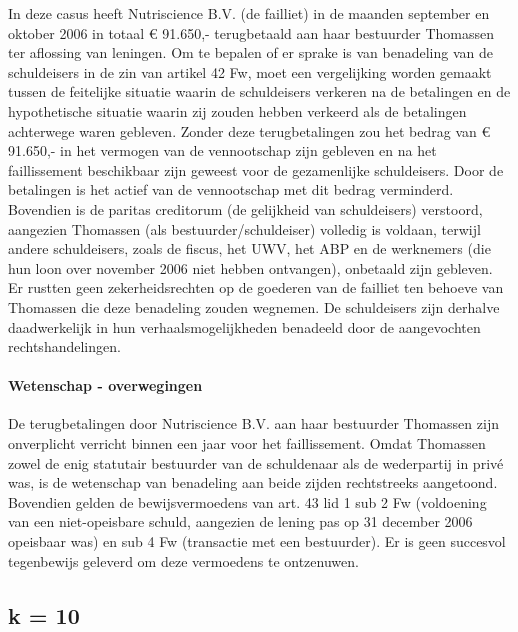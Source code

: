 \documentclass[
  dutch,
  a4paper,
]{article}
\begin{document}
In deze casus heeft Nutriscience B.V. (de failliet) in de maanden september en oktober 2006 in totaal € 91.650,- terugbetaald aan haar bestuurder Thomassen ter aflossing van leningen. Om te bepalen of er sprake is van benadeling van de schuldeisers in de zin van artikel 42 Fw, moet een vergelijking worden gemaakt tussen de feitelijke situatie waarin de schuldeisers verkeren na de betalingen en de hypothetische situatie waarin zij zouden hebben verkeerd als de betalingen achterwege waren gebleven. Zonder deze terugbetalingen zou het bedrag van € 91.650,- in het vermogen van de vennootschap zijn gebleven en na het faillissement beschikbaar zijn geweest voor de gezamenlijke schuldeisers. Door de betalingen is het actief van de vennootschap met dit bedrag verminderd. Bovendien is de paritas creditorum (de gelijkheid van schuldeisers) verstoord, aangezien Thomassen (als bestuurder/schuldeiser) volledig is voldaan, terwijl andere schuldeisers, zoals de fiscus, het UWV, het ABP en de werknemers (die hun loon over november 2006 niet hebben ontvangen), onbetaald zijn gebleven. Er rustten geen zekerheidsrechten op de goederen van de failliet ten behoeve van Thomassen die deze benadeling zouden wegnemen. De schuldeisers zijn derhalve daadwerkelijk in hun verhaalsmogelijkheden benadeeld door de aangevochten rechtshandelingen.

\paragraph{Wetenschap - overwegingen}\label{wetenschap---overwegingen-77}

De terugbetalingen door Nutriscience B.V. aan haar bestuurder Thomassen zijn onverplicht verricht binnen een jaar voor het faillissement. Omdat Thomassen zowel de enig statutair bestuurder van de schuldenaar als de wederpartij in privé was, is de wetenschap van benadeling aan beide zijden rechtstreeks aangetoond. Bovendien gelden de bewijsvermoedens van art. 43 lid 1 sub 2 Fw (voldoening van een niet-opeisbare schuld, aangezien de lening pas op 31 december 2006 opeisbaar was) en sub 4 Fw (transactie met een bestuurder). Er is geen succesvol tegenbewijs geleverd om deze vermoedens te ontzenuwen.

\newpage


\subsection{k = 10}\label{k-10-8}
\end{document}
